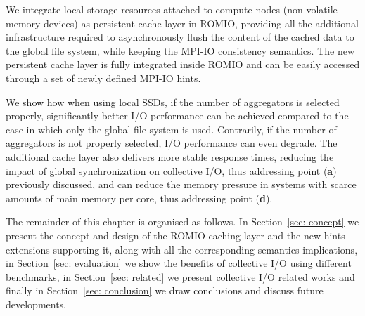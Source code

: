 We integrate local storage resources attached to compute nodes (non-volatile memory devices) as persistent cache layer in ROMIO, providing all the additional infrastructure required to asynchronously flush the content of the cached data to the global file system, while keeping the MPI-IO consistency semantics. The new persistent cache layer is fully integrated inside ROMIO and can be easily accessed through a set of newly defined MPI-IO hints.

We show how when using local SSDs, if the number of aggregators is selected properly, significantly better I/O performance can be achieved compared to the case in which only the global file system is used. Contrarily, if the number of aggregators is not properly selected, I/O performance can even degrade. The additional cache layer also delivers more stable response times, reducing the impact of global synchronization on collective I/O, thus addressing point (\textbf{a}) previously discussed, and can reduce the memory pressure in systems with scarce amounts of main memory per core, thus addressing point (\textbf{d}).

The remainder of this chapter is organised as follows. In Section~\ref{sec: concept} we present the concept and design of the ROMIO caching layer and the new hints extensions supporting it, along with all the corresponding semantics implications, in Section~\ref{sec: evaluation} we show the benefits of collective I/O using different benchmarks, in Section~\ref{sec: related} we present collective I/O related works and finally in Section~\ref{sec: conclusion} we draw conclusions and discuss future developments.
